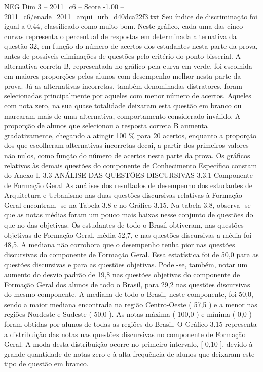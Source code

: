 \begin{textsample}{NEG Dim 3 – 2011\_c6 – Score -1.00 – 2011\_c6/enade\_2011\_arqui\_urb\_d40dca22f3.txt}
Seu índice de discriminação foi igual a 0,44, classificado como muito bom.
Neste gráfico, cada uma das cinco curvas representa o percentual de respostas em determinada alternativa da questão 32, em função do número de acertos dos estudantes nesta parte da prova, antes de possíveis eliminações de questões pelo critério do ponto bisserial.
A alternativa correta B, representada no gráfico pela curva em verde, foi escolhida em maiores proporções pelos alunos com desempenho melhor nesta parte da prova.
Já as alternativas incorretas, também denominadas distratores, foram selecionadas principalmente por aqueles com menor número de acertos.
Aqueles com nota zero, na sua quase totalidade deixaram esta questão em branco ou marcaram mais de uma alternativa, comportamento considerado inválido.
A proporção de alunos que selecionou a resposta correta B aumenta gradativamente, chegando a atingir 100 \% para 20 acertos, enquanto a proporção dos que escolheram alternativas incorretas decai, a partir dos primeiros valores não nulos, como função do número de acertos nesta parte da prova.
Os gráficos relativos às demais questões do componente de Conhecimento Específico constam do Anexo I. 3.3 ANÁLISE DAS QUESTÕES DISCURSIVAS 3.3.1 Componente de Formação Geral As análises dos resultados de desempenho dos estudantes de Arquitetura e Urbanismo nas duas questões discursivas relativas à Formação Geral encontram -se na Tabela 3.8 e no Gráfico 3.15.
Na tabela 3.8, observa -se que as notas médias foram um pouco mais baixas nesse conjunto de questões do que no das objetivas.
Os estudantes de todo o Brasil obtiveram, nas questões objetivas de Formação Geral, média 52,7, e nas questões discursivas a média foi 48,5.
A mediana não corrobora que o desempenho tenha pior nas questões discursivas do componente de Formação Geral.
Essa estatística foi de 50,0 para as questões discursivas e para as questões objetivas.
Pode -se, também, notar um aumento do desvio padrão de 19,8 nas questões objetivas do componente de Formação Geral dos alunos de todo o Brasil, para 29,2 nas questões discursivas do mesmo componente.
A mediana de todo o Brasil, neste componente, foi 50,0, sendo a maior mediana encontrada na região Centro-Oeste ( 57,5 ) e a menor nas regiões Nordeste e Sudeste ( 50,0 ).
As notas máxima ( 100,0 ) e mínima ( 0,0 ) foram obtidas por alunos de todas as regiões do Brasil.
O Gráfico 3.15 representa a distribuição das notas nas questões discursivas no componente de Formação Geral.
A moda desta distribuição ocorre no primeiro intervalo, [ 0,10 ], devido à grande quantidade de notas zero e à alta frequência de alunos que deixaram este tipo de questão em branco.

\end{textsample}
